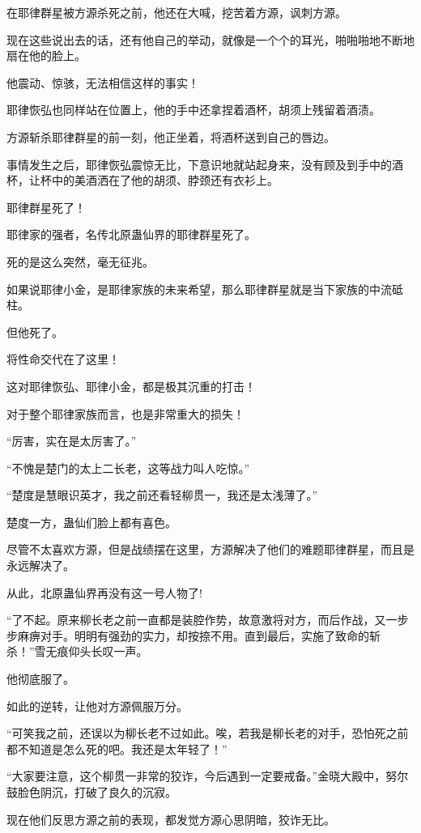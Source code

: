 \begin{this_body}
在耶律群星被方源杀死之前，他还在大喊，挖苦着方源，讽刺方源。

现在这些说出去的话，还有他自己的举动，就像是一个个的耳光，啪啪啪地不断地扇在他的脸上。

他震动、惊骇，无法相信这样的事实！

耶律恢弘也同样站在位置上，他的手中还拿捏着酒杯，胡须上残留着酒渍。

方源斩杀耶律群星的前一刻，他正坐着，将酒杯送到自己的唇边。

事情发生之后，耶律恢弘震惊无比，下意识地就站起身来，没有顾及到手中的酒杯，让杯中的美酒洒在了他的胡须、脖颈还有衣衫上。

耶律群星死了！

耶律家的强者，名传北原蛊仙界的耶律群星死了。

死的是这么突然，毫无征兆。

如果说耶律小金，是耶律家族的未来希望，那么耶律群星就是当下家族的中流砥柱。

但他死了。

将性命交代在了这里！

这对耶律恢弘、耶律小金，都是极其沉重的打击！

对于整个耶律家族而言，也是非常重大的损失！

“厉害，实在是太厉害了。”

“不愧是楚门的太上二长老，这等战力叫人吃惊。”

“楚度是慧眼识英才，我之前还看轻柳贯一，我还是太浅薄了。”

楚度一方，蛊仙们脸上都有喜色。

尽管不太喜欢方源，但是战绩摆在这里，方源解决了他们的难题耶律群星，而且是永远解决了。

从此，北原蛊仙界再没有这一号人物了!

“了不起。原来柳长老之前一直都是装腔作势，故意激将对方，而后作战，又一步步麻痹对手。明明有强劲的实力，却按捺不用。直到最后，实施了致命的斩杀！”雪无痕仰头长叹一声。

他彻底服了。

如此的逆转，让他对方源佩服万分。

“可笑我之前，还误以为柳长老不过如此。唉，若我是柳长老的对手，恐怕死之前都不知道是怎么死的吧。我还是太年轻了！”

“大家要注意，这个柳贯一非常的狡诈，今后遇到一定要戒备。”金晓大殿中，努尔鼓脸色阴沉，打破了良久的沉寂。

现在他们反思方源之前的表现，都发觉方源心思阴暗，狡诈无比。


\end{this_body}
